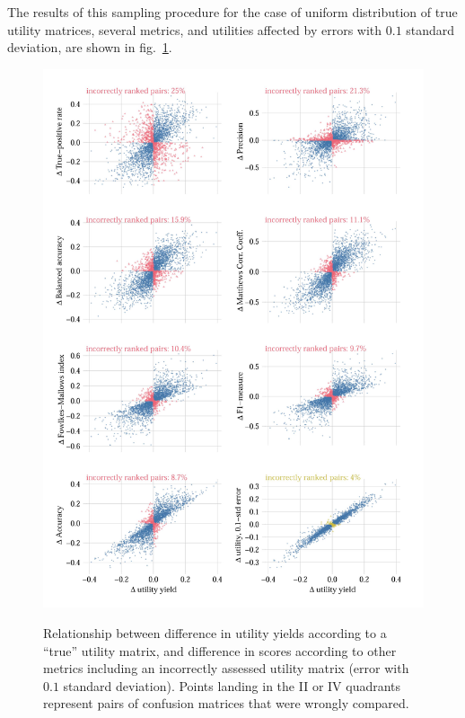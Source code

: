 \documentclass[\ifafour a4paper,12pt,\else a5paper,10pt,\fi%
onecolumn,oneside,article,%
british%
]{memoir}
\theoremstyle{remark}
\theoremstyle{innote}
\renewcommand*{\|}[1][]{\nonscript\:#1\vert\nonscript\:\mathopen{}}
\newcommand*{\fig}{fig.}%
\begin{document}
The results of this sampling procedure for the case of uniform distribution of true utility matrices, several metrics, and utilities affected by errors with $0.1$ standard deviation, are shown in \fig~\ref{fig:wrongly_ranked_pairs}.
\begin{figure}[p]
  \centering
    \includegraphics[width=\linewidth]{incorrectscores4unif-11.jpg}\\
  \caption{Relationship between difference in utility yields according to a \enquote{true} utility matrix, and difference in scores according to other metrics including an incorrectly assessed utility matrix (error with $0.1$ standard deviation). Points landing in the II or IV quadrants represent pairs of confusion matrices that were wrongly compared.}
  \label{fig:wrongly_ranked_pairs}
\end{figure}
\end{document}
